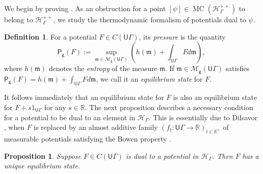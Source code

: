 \documentclass[twoside]{amsart}
\newtheorem{proposition}[theorem]{Proposition}
\theoremstyle{definition}
\newtheorem{definition}[theorem]{Definition}
\numberwithin{equation}{section}
\numberwithin{theorem}{section}
\newcommand{\msf}[1]{\mathsf{#1}}
\newcommand{\R}{\mathbb{R}}
\newcommand{\calH}{\mathcal{H}}
\newcommand{\calM}{\mathcal{M}}
\newcommand{\scrD}{\mathscr{D}}
\newcommand{\scrH}{\mathscr{H}}
\newcommand{\frakm}{\mathfrak{m}}
\newcommand{\G}{\Gamma}
\newcommand{\p}{\psi}
\newcommand{\ra}{\rightarrow}
\newcommand{\UG}{\msf{U}\G}
\DeclareMathOperator{\MC}{MC}
\newcommand{\vg}{\msf{g}}
\newcommand{\DMG}[1]{{\color{orange} \bf{(DMG: #1)}}}
\begin{document}
We begin by proving . As an obstruction for a point $[\p]\in \MC(\scrH_\G^{++})$ to belong to $\scrH_\G^{++}$, we study the thermodynamic formalism of potentials dual to $\p$.
\begin{definition}
  For a potential $F\in C(\UG)$, its \emph{pressure} is the quantity
 \[\msf{P}_{\msf{g}}(F):=\sup_{\frakm\in \calM_{\msf{g}}(\UG)}\left(h(\frakm)+\int_{\UG}Fd\frakm\right),\] 
  where $h(\frakm)$ denotes the \emph{entropy} of the measure $\frakm$. If $\frakm\in \calM_\vg(\UG)$ satisfies $\msf{P}_{\vg}(F)=h(\frakm)+\int_{\UG}{Fd\frakm}$, we call it an \emph{equilibrium state} for $F$.
\end{definition}

It follows immediately that an equilibrium state for $F$ is also an equilibrium state for $F+s\mathrm{1}_{\UG}$ for any $s\in \R$. The next proposition describes a necessary condition for a potential to be dual to an element in $\calH_\G$.  This is essentially due to Dilsavor \cite[Theorem~F]{dilsavor}, when $F$ is replaced by an almost additive family $(f_t:\UG \ra \R)_{t\in \R^+}$ of measurable potentials satisfying the Bowen property \cite[Definition~4.2.2]{dilsavor}.

\begin{proposition}\label{prop:Gibbs=BMS} Suppose $F\in C(\UG)$ is dual to a potential in $\calH_\G$. Then $F$ has a unique equilibrium state.
\end{proposition}
\end{document}
